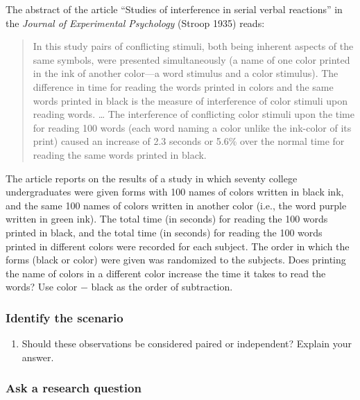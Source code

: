 \documentclass[
]{report}
\providecommand{\tightlist}{%
  \setlength{\itemsep}{0pt}\setlength{\parskip}{0pt}}
\begin{document}
The abstract of the article ``Studies of interference in serial verbal reactions'' in the \emph{Journal of Experimental Psychology} (Stroop 1935) reads:

\begin{quote}
In this study pairs of conflicting stimuli, both being inherent aspects of the same symbols, were presented simultaneously (a name of one color printed in the ink of another color---a word stimulus and a color stimulus).
The difference in time for reading the words printed in colors and the same words printed in black is the measure of interference of color stimuli upon reading words. \ldots{}
The interference of conflicting color stimuli upon the time for reading 100 words (each word naming a color unlike the ink-color of its print) caused an increase of 2.3 seconds or 5.6\% over the normal time for reading the same words printed in black.
\end{quote}

The article reports on the results of a study in which seventy college undergraduates were given forms with 100 names of colors written in black ink, and the same 100 names of colors written in another color (i.e., the word purple written in green ink). The total time (in seconds) for reading the 100 words printed in black, and the total time (in seconds) for reading the 100 words printed in different colors were recorded for each subject. The order in which the forms (black or color) were given was randomized to the subjects. Does printing the name of colors in a different color increase the time it takes to read the words? Use color \(-\) black as the order of subtraction.

\hypertarget{identify-the-scenario}{%
\subsubsection*{Identify the scenario}\label{identify-the-scenario}}

\begin{enumerate}
\def\labelenumi{\arabic{enumi}.}
\tightlist
\item
  Should these observations be considered paired or independent? Explain your answer.
  \vspace{0.5in}
\end{enumerate}

\hypertarget{ask-a-research-question-1}{%
\subsubsection*{Ask a research question}\label{ask-a-research-question-1}}
\end{document}
